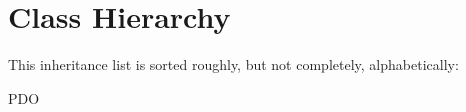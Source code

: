 \section{Class Hierarchy}
This inheritance list is sorted roughly, but not completely, alphabetically\+:\begin{DoxyCompactList}
\item {}
\item {}
\item P\+DO\begin{DoxyCompactList}
\item {}
\begin{DoxyCompactList}
\item {}
\item {}
\end{DoxyCompactList}
\end{DoxyCompactList}
\item {}
\end{DoxyCompactList}
